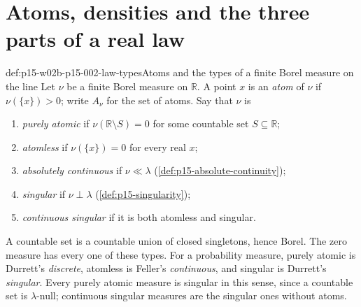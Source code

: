 \section{Atoms, densities and the three parts of a real law}
\label{sec:p15-w02b-p15-002-three-parts}

\begin{hbdefinition}{def:p15-w02b-p15-002-law-types}{Atoms and the types of a finite Borel measure on the line}
Let \(\nu\) be a finite Borel measure on \(\mathbb R\). A point \(x\) is
an \emph{atom} of \(\nu\) if \(\nu(\{x\})>0\); write \(A_\nu\) for the set
of atoms. Say that \(\nu\) is
\begin{enumerate}
\item \emph{purely atomic} if \(\nu(\mathbb R\setminus S)=0\) for some
      countable set \(S\subseteq\mathbb R\);
\item \emph{atomless} if \(\nu(\{x\})=0\) for every real \(x\);
\item \emph{absolutely continuous} if \(\nu\ll\lambda\)
      (\cref{def:p15-absolute-continuity});
\item \emph{singular} if \(\nu\perp\lambda\)
      (\cref{def:p15-singularity});
\item \emph{continuous singular} if it is both atomless and singular.
\end{enumerate}
A countable set is a countable union of closed singletons, hence Borel.
The zero measure has every one of these types. For a probability measure,
purely atomic is Durrett's \emph{discrete}, atomless is Feller's
\emph{continuous}, and singular is Durrett's \emph{singular}.
Every purely atomic measure is singular in this sense, since a countable
set is \(\lambda\)-null; continuous singular measures are the singular
ones without atoms.
\end{hbdefinition}

